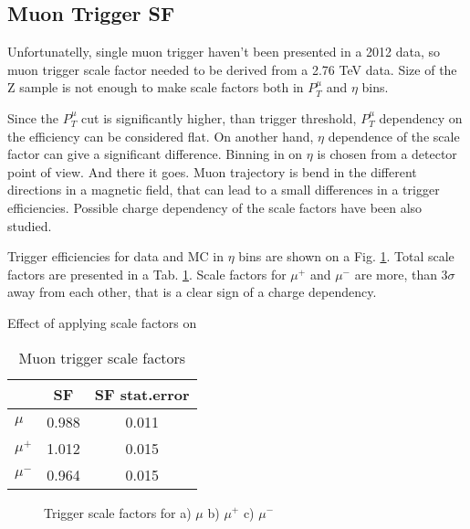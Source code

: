 \subsection{Muon Trigger SF}
Unfortunatelly, single muon trigger haven't been presented in a 2012 data, so muon trigger scale factor needed to be derived from a 2.76 TeV data. Size of the Z sample is not enough to make scale factors both in $P_{T}^{\mu}$ and $\eta$ bins. 

Since the $P_{T}^{\mu}$ cut is significantly higher, than trigger threshold, $P_{T}^{\mu}$ dependency on the efficiency can be considered flat. On another hand, $\eta$ dependence of the scale factor can give a significant difference. Binning in on $\eta$ is chosen from a detector point of view. And there it goes. Muon trajectory is bend in the different directions in a magnetic field, that can lead to a small differences in a trigger efficiencies.  Possible charge dependency of the scale factors have been also studied. 

Trigger efficiencies for data and MC in $\eta$ bins are shown on a Fig. \ref{fig:MuSF}. Total scale factors are presented in a Tab. \ref{tab:MuonSF}. Scale factors for $\mu^{+}$ and $\mu^{-}$ are more, than 3$\sigma$ away from each other, that is a clear sign of a charge dependency. 

Effect of applying scale factors on 

\begin{table}[h]
    \caption{Muon trigger scale factors}
	\label{tab:MuonSF}
	\begin{center}
		\begin{tabular}{|l | c | c|}
		\hline
		& SF & SF stat.error\\
		\hline
		\hline
		$\mu$ & 0.988 & 0.011\\
		\hline
		$\mu^{+}$ & 1.012 & 0.015\\
		$\mu^{-}$ & 0.964 & 0.015\\
		\hline
		\end{tabular}
		\end{center}
\end{table}

\begin{figure}[!htb]
\endminipage\hfill
{}
\endminipage\hfill
{}%
\endminipage
\caption{Trigger scale factors for a) $\mu$ b) $\mu^{+}$  c) $\mu^{-}$}
\label{fig:MuSF}
\end{figure}

